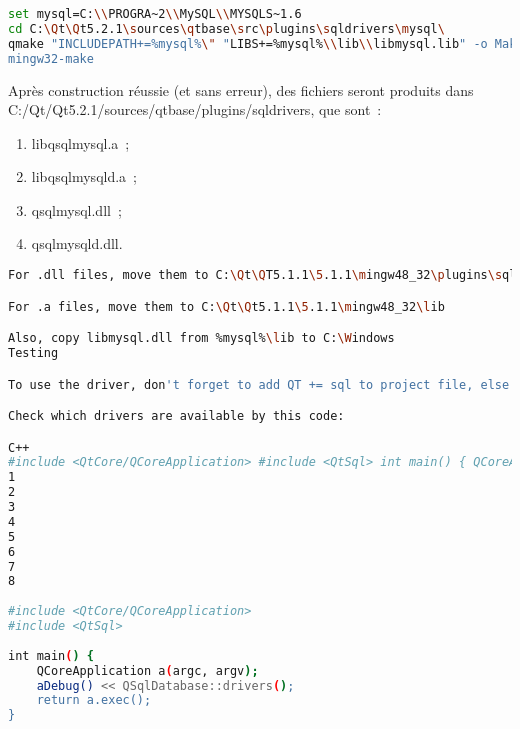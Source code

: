 \begin{lstlisting}[language=Bash, escapechar=$]
set mysql=C:\\PROGRA~2\\MySQL\\MYSQLS~1.6
cd C:\Qt\Qt5.2.1\sources\qtbase\src\plugins\sqldrivers\mysql\
qmake "INCLUDEPATH+=%mysql%\" "LIBS+=%mysql%\\lib\\libmysql.lib" -o Makefile mysql.pro
mingw32-make
\end{lstlisting}
Après construction réussie (et sans erreur), des fichiers seront produits dans C:/Qt/Qt5.2.1/sources/qtbase/plugins/sqldrivers, que sont~:
\begin{enumerate}
	\item libqsqlmysql.a~;
	\item libqsqlmysqld.a~;
	\item qsqlmysql.dll~;
	\item qsqlmysqld.dll.
\end{enumerate}
\begin{lstlisting}[language=Bash, escapechar=$]
For .dll files, move them to C:\Qt\QT5.1.1\5.1.1\mingw48_32\plugins\sqldrivers.

For .a files, move them to C:\Qt\Qt5.1.1\5.1.1\mingw48_32\lib

Also, copy libmysql.dll from %mysql%\lib to C:\Windows
Testing

To use the driver, don't forget to add QT += sql to project file, else it don't work.

Check which drivers are available by this code:

C++
#include <QtCore/QCoreApplication> #include <QtSql> int main() { QCoreApplication a(argc, argv); aDebug() << QSqlDatabase::drivers(); return a.exec(); }
1
2
3
4
5
6
7
8
	
#include <QtCore/QCoreApplication>
#include <QtSql>
 
int main() {
    QCoreApplication a(argc, argv);
    aDebug() << QSqlDatabase::drivers();
    return a.exec();
}

\end{lstlisting}
